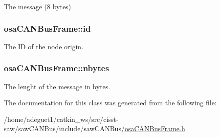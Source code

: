 The message (8 bytes) 

\hypertarget{classosa_c_a_n_bus_frame_a43c2a396a6f7dcf502daeb8f3cc8967e}{
\subsubsection[{id}]{ osa\-C\-A\-N\-Bus\-Frame\-::id\hspace{0.3cm}{\ttfamily [protected]}}}\label{classosa_c_a_n_bus_frame_a43c2a396a6f7dcf502daeb8f3cc8967e}


The I\-D of the node origin. 

\hypertarget{classosa_c_a_n_bus_frame_abc694b0742e9c5b7e2db8640caa17565}{
\subsubsection[{nbytes}]{ osa\-C\-A\-N\-Bus\-Frame\-::nbytes\hspace{0.3cm}{\ttfamily [protected]}}}\label{classosa_c_a_n_bus_frame_abc694b0742e9c5b7e2db8640caa17565}


The lenght of the message in bytes. 



The documentation for this class was generated from the following file\-:\begin{DoxyCompactItemize}
\item 
/home/adeguet1/catkin\-\_\-ws/src/cisst-\/saw/saw\-C\-A\-N\-Bus/include/saw\-C\-A\-N\-Bus/\hyperlink{osa_c_a_n_bus_frame_8h}{osa\-C\-A\-N\-Bus\-Frame.\-h}\end{DoxyCompactItemize}
